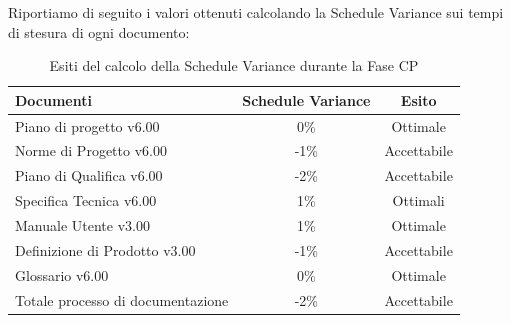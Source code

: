 Riportiamo di seguito i valori ottenuti calcolando la Schedule Variance sui tempi di stesura di ogni documento:
			\begin{table}[H]
					\centering
					\begin{tabu}{| l | c | c |}
							\hline
							Documenti 							& Schedule Variance	& Esito		\\ \hline \hline
							
							Piano di progetto v6.00				& 0\% 		& Ottimale  \\ \hline
							Norme di Progetto v6.00 			& -1\%		& Accettabile  \\ \hline
							Piano di Qualifica v6.00 			& -2\%		& Accettabile  \\ \hline
							Specifica Tecnica v6.00 			& 1\%		& Ottimali  \\ \hline
							Manuale Utente v3.00 			& 1\%		& Ottimale  \\ \hline
							Definizione di Prodotto v3.00 			& -1\%		& Accettabile  \\ \hline
							Glossario v6.00					 	& 0\% 		& Ottimale  \\ \hline
							Totale processo di documentazione & -2\% & Accettabile \\ \hline
						\end{tabu}
					\caption{Esiti del calcolo della Schedule Variance durante la Fase CP}
				\end{table}
				
